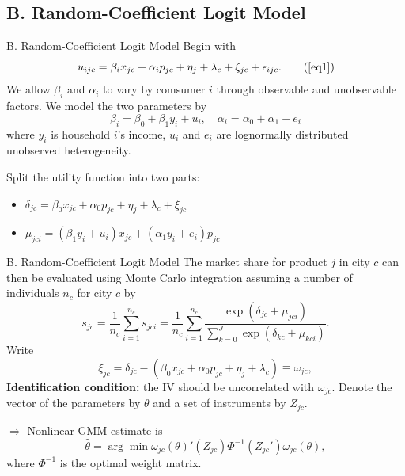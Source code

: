 \documentclass{beamer}
\begin{document}
\subsection{B. Random-Coefficient Logit Model}
\begin{frame}[shrink]
	\transfade %
	\tableofcontents[sectionstyle=show/shaded,subsectionstyle=show/shaded/hide]
	\addtocounter{framenumber}{-1}
\end{frame}
\begin{frame}{B. Random-Coefficient Logit Model}
	Begin with	
	\begin{equation*}
		u_{ijc}=\beta_ix_{jc}+\alpha_ip_{jc}+\eta_j+\lambda_c+\xi_{jc}+\epsilon_{ijc}. \tag{\ref{eq1}}
	\end{equation*}
	We allow $\beta_i$ and $\alpha_i$ to vary by comsumer $i$ through observable and unobservable factors. We model the two parameters by $$ \beta_i=\beta_0+\beta_1y_i+u_i,\quad \alpha_i=\alpha_0+\alpha_1+e_i $$
	where $y_i$ is household $i$'s income, $u_i$ and $e_i$ are lognormally distributed unobserved heterogeneity.

	Split the utility function into two parts:
	\begin{itemize}
		\item $\delta_{jc}=\beta_0x_{jc}+\alpha_0p_{jc}+\eta_j+\lambda_c+\xi_{jc}$
		\item $\mu_{jci}=(\beta_1y_i+u_i)x_{jc}+(\alpha_1y_i+e_i)p_{jc}$
	\end{itemize}
\end{frame}
\begin{frame}{B. Random-Coefficient Logit Model}
	The market share for product $j$ in city $c$ can then be evaluated using Monte Carlo integration assuming a number of individuals $n_c$ for city $c$ by
	\begin{equation}
		s_{jc}=\frac{1}{n_c}\sum_{i=1}^{n_c}s_{jci}=\frac{1}{n_c}\sum_{i=1}^{n_c}\frac{\exp(\delta_{jc}+\mu_{jci})}{\sum_{k=0}^J\exp(\delta_{kc}+\mu_{kci})}.
	\end{equation}
	Write $$\xi_{jc}=\delta_{jc}-(\beta_0x_{jc}+\alpha_0p_{jc}+\eta_j+\lambda_c)\equiv\omega_{jc}, $$
	\textbf{Identification condition:} the IV should be uncorrelated with $\omega_{jc}$. Denote the vector of the parameters by $\theta$ and a set of instruments by $Z_{jc}$.
	
	$\Rightarrow$ Nonlinear GMM estimate is
	\begin{equation}
		\hat{\theta}=\arg\min \omega_{jc}(\theta)'(Z_{jc})\Phi^{-1}(Z_{jc}')\omega_{jc}(\theta),
	\end{equation}
	where $\Phi^{-1}$ is the optimal weight matrix.
\end{frame}
\end{document}
